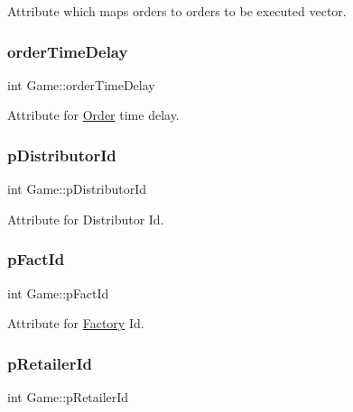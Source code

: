 Attribute which maps orders to orders to be executed vector. 

\mbox{\label{class_game_a337c34aba5afe4984d5a76e2dfb8800e}} 
\subsubsection{\texorpdfstring{order\+Time\+Delay}{orderTimeDelay}}
{\footnotesize\ttfamily int Game\+::order\+Time\+Delay\hspace{0.3cm}{\ttfamily [private]}}



Attribute for \hyperlink{class_order}{Order} time delay. 

\mbox{\label{class_game_a3a1c85c5fdd16e9b99ba4c45ae2c6368}} 
\subsubsection{\texorpdfstring{p\+Distributor\+Id}{pDistributorId}}
{\footnotesize\ttfamily int Game\+::p\+Distributor\+Id\hspace{0.3cm}{\ttfamily [private]}}



Attribute for Distributor Id. 

\mbox{\label{class_game_ac516a7154e48c4ca10b40da5c1a1ab6d}} 
\subsubsection{\texorpdfstring{p\+Fact\+Id}{pFactId}}
{\footnotesize\ttfamily int Game\+::p\+Fact\+Id\hspace{0.3cm}{\ttfamily [private]}}



Attribute for \hyperlink{class_factory}{Factory} Id. 

\mbox{\label{class_game_aad086ef718ee39a0b0f72fbfafb5e30c}} 
\subsubsection{\texorpdfstring{p\+Retailer\+Id}{pRetailerId}}
{\footnotesize\ttfamily int Game\+::p\+Retailer\+Id\hspace{0.3cm}{\ttfamily [private]}}



